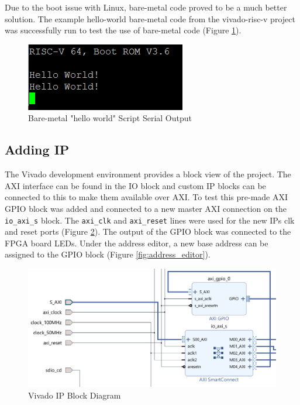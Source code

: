 Due to the boot issue with Linux, bare-metal code proved to be a much better solution. The example hello-world bare-metal code from the vivado-risc-v project was successfully run to test the use of bare-metal code (Figure \ref{fig:helloworld}).

\begin{figure}[H]
	\centering
	\includegraphics[scale=1]{bare-metal.png}
	\caption{Bare-metal "hello world" Script Serial Output}
	\label{fig:helloworld}
\end{figure}

\subsection{Adding IP}
The Vivado development environment provides a block view of the project. The AXI interface can be found in the IO block and custom IP blocks can be connected to this to make them available over AXI. To test this pre-made AXI GPIO block \cite{xilinx_gpio} was added and connected to a new master AXI connection on the \texttt{io\_axi\_s} block. The \texttt{axi\_clk} and \texttt{axi\_reset} lines were used for the new IPs clk and reset ports (Figure \ref{fig:gpio_ip}). The output of the GPIO block was connected to the FPGA board LEDs. Under the address editor, a new base address can be assigned to the GPIO block (Figure \ref{fig:address_editor}).

\begin{figure}[H]
	\centering
	\includegraphics[scale=0.4]{GPIO_IP.png}
	\caption{Vivado IP Block Diagram}
	\label{fig:gpio_ip}
\end{figure}

